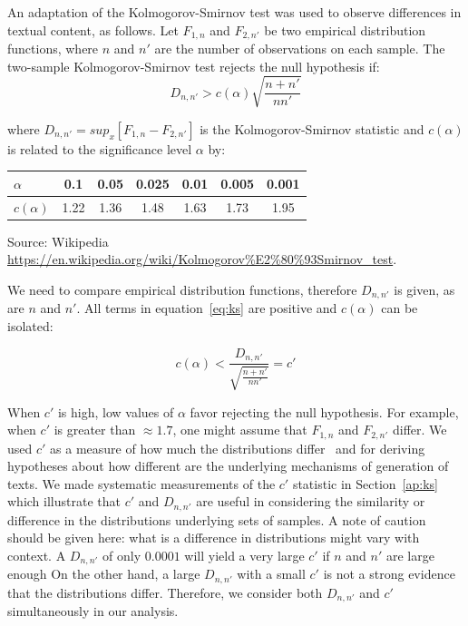 An adaptation of the Kolmogorov-Smirnov test was used to observe differences in textual content, as follows.
Let $F_{1,n}$ and $F_{2,n'}$ be two empirical distribution functions, where $n$ and $n'$ are the number of observations on each sample.
The two-sample Kolmogorov-Smirnov test rejects the null hypothesis if:
\begin{equation}\label{eq:ks}
D_{n,n'} > c(\alpha)\sqrt{\frac{n+n'}{nn'}}
\end{equation}

\noindent where $D_{n,n'}=sup_x[F_{1,n}-F_{2,n'}]$ is the Kolmogorov-Smirnov statistic
and $c(\alpha)$ is related to the significance level $\alpha$ by:

\begin{table}[H]
\centering
\begin{tabular}{|l||c|c|c|c|c|c|}\hline
$\alpha$    & 0.1  & 0.05 & 0.025 & 0.01 & 0.005 & 0.001 \\\hline
$c(\alpha)$ & 1.22 & 1.36 & 1.48  & 1.63 & 1.73  & 1.95  \\\hline
\end{tabular}
\begin{flushleft}
	Source: Wikipedia \url{https://en.wikipedia.org/wiki/Kolmogorov%E2%80%93Smirnov_test}.\
\end{flushleft}
\end{table}

We need to compare empirical distribution functions,
therefore $D_{n,n'}$ is given, as are $n$ and $n'$.
All terms in equation~\ref{eq:ks} are positive and $c(\alpha)$ can be isolated:

\begin{equation}\label{eq:ks2}
c(\alpha) < \frac{D_{n,n'}}{\sqrt{\frac{n+n'}{nn'}}} = c'
\end{equation}

When $c'$ is high, low values of $\alpha$ favor rejecting the null hypothesis.
For example, when $c'$ is greater than $\approx 1.7$, one might assume that $F_{1,n}$ and $F_{2,n'}$ differ.
We used $c'$ as a measure of how much
the distributions differ~\cite{kolm}
and for deriving hypotheses
about how different are the underlying mechanisms of generation of texts.
We made systematic measurements of the $c'$ statistic in Section~\ref{ap:ks}
which illustrate that $c'$ and $D_{n,n'}$ are useful in considering the
similarity or difference in the distributions underlying sets of samples.
A note of caution should be given here: what is a difference in distributions
might vary with context.
A $D_{n,n'}$ of only $0.0001$ will yield a very large $c'$ if $n$ and $n'$ are large enough
On the other hand, a large $D_{n,n'}$ with a small $c'$ is not a strong evidence that
the distributions differ.
Therefore, we consider both $D_{n,n'}$ and $c'$ simultaneously in our analysis.


